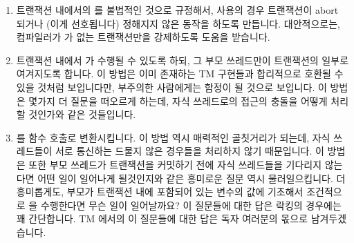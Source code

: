 \begin{enumerate}
\item	트랜잭션 내에서의  를 불법적인 것으로 규정해서,
	 사용의 경우 트랜잭션이 abort 되거나 (이게
	선호됩니다) 정해지지 않은 동작을 하도록 만듭니다.
	대안적으로는, 컴파일러가  가 없는 트랜잭션만을
	강제하도록 도움을 받습니다.
\item	트랜잭션 내에서  가 수행될 수 있도록 하되, 그 부모
	쓰레드만이 트랜잭션의 일부로 여겨지도록 합니다.
	이 방법은 이미 존재하는 TM 구현들과 합리적으로 호환될 수 있을 것처럼
	보입니다만, 부주의한 사람에게는 함정이 될 것으로 보입니다.
	이 방법은 몇가지 더 질문을 떠오르게 하는데, 자식 쓰레드로의 접근의
	충돌을 어떻게 처리할 것인가와 같은 것들입니다.

\item	{} 를 함수 호출로 변환시킵니다.
	이 방법 역시 매력적인 골칫거리가 되는데, 자식 쓰레드들이 서로 통신하는
	드물지 않은 경우들을 처리하지 않기 때문입니다.
	이 방법은 또한 부모 쓰레드가 트랜잭션을 커밋하기 전에 자식 쓰레드들을
	기다리지 않는다면 어떤 일이 일어나게 될것인지와 같은 흥미로운 질문 역시
	물러일으킵니다.
	더 흥미롭게도, 부모가 트랜잭션 내에 포함되어 있는 변수의 값에 기초해서
	조건적으로  을 수행한다면 무슨 일이 일어날까요?
	이 질문들에 대한 답은 락킹의 경우에는 꽤 간단합니다.
	TM 에서의 이 질문들에 대한 답은 독자 여러분의 몫으로 남겨두겠습니다.
\iffalse


\end{enumerate}
